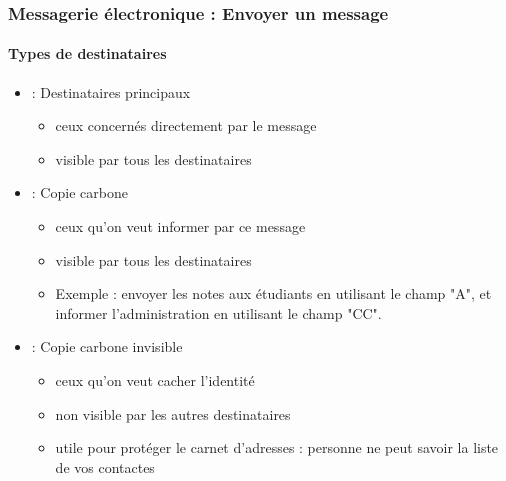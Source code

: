 \documentclass[xcolor=table]{beamer}
\begin{document}
\begin{frame}
\frametitle{Messagerie électronique : Envoyer un message}
\framesubtitle{Types de destinataires}

\begin{itemize}
	\item {} : Destinataires principaux
	\begin{itemize}
		\item ceux concernés directement par le message 
		\item visible par tous les destinataires
	\end{itemize}

	\item {} : Copie carbone
	\begin{itemize}
		\item ceux qu'on veut informer par ce message 
		\item visible par tous les destinataires
		\item Exemple : envoyer les notes aux étudiants en utilisant le champ "A", et informer l'administration en utilisant le champ "CC".
	\end{itemize}

	\item {} : Copie carbone invisible
	\begin{itemize}
		\item ceux qu'on veut cacher l'identité 
		\item non visible par les autres destinataires
		\item utile pour protéger le carnet d'adresses : personne ne peut savoir la liste de vos contactes
	\end{itemize}

\end{itemize}


\end{frame}
\end{document}
